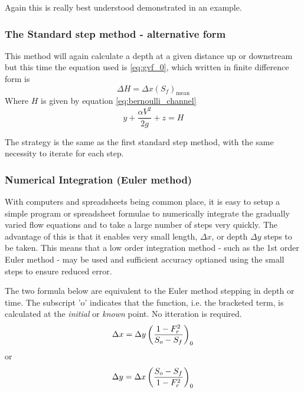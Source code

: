 \documentclass[a4paper, 12pt, british]{article} %
\numberwithin{equation}{section}
\numberwithin{figure}{section}
\numberwithin{table}{section}
\begin{document}
Again this is really best understood demonstrated in an example.

\subsubsection{The Standard step method - alternative form}

This method will again calculate a depth at a given distance up or downstream but this time the equation used is \ref{eq:gvf_0}, which written in finite difference form is
\begin{equation*}
\Delta H = \Delta x (S_f)_\text{mean}
\label{eq:gvf_0_discrete} %
\end{equation*}
Where $H$ is given by equation \ref{eq:bernoulli_channel}
  \begin{equation}
y  + \frac{ \alpha V^2}{2g} + z  = H
\end{equation}
 
The strategy is the same as the first standard step method, with the same necessity to iterate for each step.

\subsubsection{Numerical Integration (Euler method)}
With computers and spreadsheets being common place, it is easy to setup a simple program or spreadsheet formulae to numerically integrate the gradually varied flow equations and to take a large number of steps very quickly. The advantage of this is that it enables very small length, $\Delta x$, or depth $\Delta y$ steps to be taken. This means that a low order integration method - such as the 1st order Euler method - may be used and sufficient accuracy optianed using the small steps to ensure reduced error.

The two formula below are equivalent to the Euler method stepping in depth or time. The subscript 'o' indicates that the function, i.e. the bracketed term, is calculated at the \textit{initial} or \textit{known} point. No itteration is required.
\begin{equation}
\Delta x = \Delta y \left(\frac{1-F_r^2}{S_o - S_f}\right)_0 \\
\end{equation}
or
\begin{equation}
\Delta y = \Delta x \left(\frac{S_o - S_f}{1-F_r^2}\right)_0 \\
\end{equation}
\end{document}
